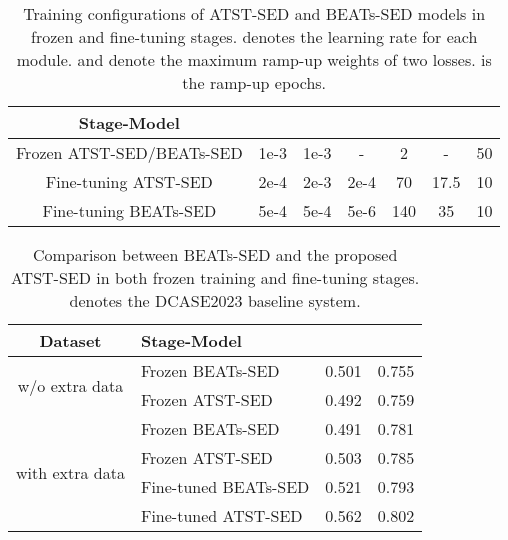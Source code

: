 \documentclass{article}
\begin{document}
\tabcolsep=2.5pt
\begin{table}[t]
\footnotesize
    \caption{Training configurations of ATST-SED and BEATs-SED  models in frozen and fine-tuning stages.  denotes the learning rate for each module.  and  denote the maximum ramp-up weights of two losses.  is the ramp-up epochs.}
    \label{tab: training_configs}
    \centering
    \begin{tabular}{ccccccc}
    \toprule
    \textbf{Stage-Model} &  &  &  &  &  &  \\
    \midrule
    Frozen ATST-SED/BEATs-SED    & 1e-3 & 1e-3 & -    & 2  & -    & 50 \\
    Fine-tuning ATST-SED   & 2e-4 & 2e-3 & 2e-4 & 70 & 17.5 & 10 \\
    Fine-tuning BEATs-SED    & 5e-4 & 5e-4 & 5e-6 & 140 & 35 & 10 \\   
    \bottomrule
    \end{tabular}
\vspace{-1em}
\end{table}

\begin{table}[t]
    \caption{Comparison between BEATs-SED and the proposed ATST-SED in both frozen training and fine-tuning stages. \textsuperscript{} denotes the DCASE2023 baseline system. }
    \label{tab: atst_beats}
    \centering
    \begin{tabular}{clcc}
    \toprule
  \bf{Dataset} & \bf{Stage-Model} &   & \\
  \midrule
  \multirow{2}{*}{w/o extra data} & Frozen BEATs-SED\textsuperscript{} & 0.501 & 0.755 \\
                                  & Frozen ATST-SED & 0.492 & 0.759  \\
  \midrule
  \multirow{4}{*}{with extra data} &  Frozen BEATs-SED & 0.491 & 0.781  \\
                                   &  Frozen ATST-SED  & 0.503 & 0.785  \\
                                   &  Fine-tuned BEATs-SED  & 0.521   & 0.793  \\
                                   &  Fine-tuned ATST-SED   & 0.562    & 0.802  \\
    \bottomrule
    \end{tabular}
\vspace{-1em}
\end{table}
\end{document}
